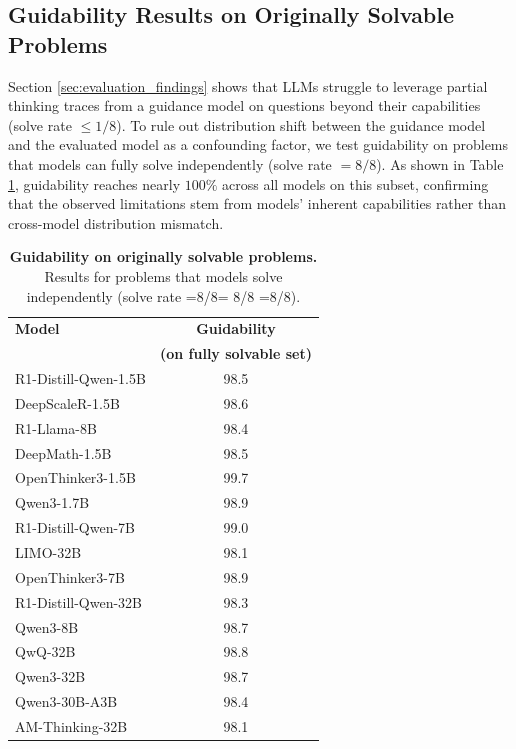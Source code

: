 \documentclass{article} %
\begin{document}
\subsection{Guidability Results on Originally Solvable Problems}
Section \ref{sec:evaluation_findings} shows that LLMs struggle to leverage partial thinking traces from a guidance model on questions beyond their capabilities (solve rate $\leq 1/8$). To rule out distribution shift between the guidance model and the evaluated model as a confounding factor, we test guidability on problems that models can fully solve independently (solve rate $= 8/8$). As shown in Table \ref{tab:ablation_recoverability_fully_solveable}, guidability reaches nearly $100\%$ across all models on this subset, confirming that the observed limitations stem from models' inherent capabilities rather than cross-model distribution mismatch.

\begin{table}[H]
  \centering
  \begin{tabular}{l|c}
    \toprule
    \multirow{1}{*}{\textbf{Model}} & \multicolumn{1}{c}{\textbf{Guidability}} \\
                                    & \textbf{(on fully solvable set)}\\
    \midrule
    R1-Distill-Qwen-1.5B    & 98.5 \\
    DeepScaleR-1.5B         & 98.6 \\
    R1-Llama-8B             & 98.4 \\
    DeepMath-1.5B           & 98.5 \\
    OpenThinker3-1.5B       & 99.7 \\
    Qwen3-1.7B              & 98.9 \\
    \midrule
    R1-Distill-Qwen-7B      & 99.0 \\
    LIMO-32B                & 98.1 \\
    OpenThinker3-7B         & 98.9 \\
    R1-Distill-Qwen-32B     & 98.3 \\
    \midrule
    Qwen3-8B                & 98.7 \\
    QwQ-32B                 & 98.8 \\
    Qwen3-32B               & 98.7 \\
    Qwen3-30B-A3B           & 98.4 \\
    AM-Thinking-32B         & 98.1 \\
    \bottomrule
  \end{tabular}
  \caption{\textbf{Guidability on originally solvable problems.} Results for problems that models solve independently (solve rate =8/8= 8/8
=8/8).}
  \label{tab:ablation_recoverability_fully_solveable}
\end{table}
\end{document}
